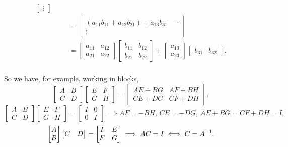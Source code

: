 \documentclass[../MathsNotesBase.tex]{subfiles}
\begin{document}
{\begin{align*}
\begin{bmatrix}
			\vdots
			\end{bmatrix} \\
		&&  &= 
			\begin{bmatrix}
			(a_{11}b_{11} + a_{12}b_{21}) + a_{13}b_{31} & \cdots\\
			\vdots
			\end{bmatrix} \\
		&&  &= 
			\begin{bmatrix}
			a_{11} & a_{12}\\
			a_{21} & a_{22}
			\end{bmatrix} 
			\begin{bmatrix}
			b_{11} & b_{12}\\
			b_{21} & b_{22}
			\end{bmatrix} + 
			\begin{bmatrix}
			a_{13}\\a_{23}
			\end{bmatrix}
			\begin{bmatrix}
			b_{31} & b_{32}
			\end{bmatrix}.\\
		\end{align*}
		
		So we have, for example, working in blocks,
		\[
			\begin{bmatrix}
			A & B\\
			C & D
			\end{bmatrix}
			\begin{bmatrix}
			E & F\\
			G & H
			\end{bmatrix} = 
			\begin{bmatrix}
			AE + BG & AF + BH\\
			CE + DG & CF + DH
			\end{bmatrix},
		\]
		\[
			\begin{bmatrix}
			A & B\\
			C & D
			\end{bmatrix}
			\begin{bmatrix}
			E & F\\
			G & H
			\end{bmatrix} = 
			\begin{bmatrix}
			I & 0\\
			0 & I
			\end{bmatrix} \implies
			AF = -BH,\, CE = -DG,\, AE + BG = CF + DH = I,
		\]
		\[ 
			\begin{bmatrix}
			A\\B
			\end{bmatrix}
			\begin{bmatrix}
			C & D
			\end{bmatrix} =
			\begin{bmatrix}
			I & E\\
			F & G
			\end{bmatrix} \implies
			AC = I \iff C = {A}^{-1}.
		\]
		
}
\end{document}

